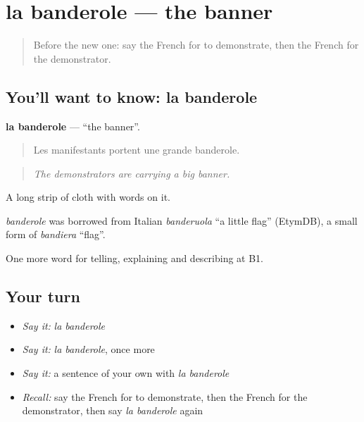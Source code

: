 \section[la banderole]{la banderole — the banner}

\label{lesson:FR-C363-banderole}



\begin{quote}
Before the new one: say the French for to demonstrate, then the French for the demonstrator.
\end{quote}

\subsection*{You'll want to know: la banderole}
\textbf{la banderole} — \textquotedblleft{}the banner\textquotedblright{}.

\begin{quote}
Les manifestants portent une grande banderole.
\end{quote}

\begin{quote}
\emph{The demonstrators are carrying a big banner.}
\end{quote}

A long strip of cloth with words on it.

\begin{cousinweb}
\emph{banderole} was borrowed from Italian \emph{banderuola} \textquotedblleft{}a little flag\textquotedblright{} (EtymDB), a small form of \emph{bandiera} \textquotedblleft{}flag\textquotedblright{}.
\end{cousinweb}

\begin{grammarlens}[title={What you've built}]
One more word for telling, explaining and describing at B1.
\end{grammarlens}

\subsection*{Your turn}
\begin{itemize}
\raggedright
  \item \emph{Say it:} \emph{la banderole}
  \item \emph{Say it:} \emph{la banderole}, once more
  \item \emph{Say it:} a sentence of your own with \emph{la banderole}
  \item \emph{Recall:} say the French for to demonstrate, then the French for the demonstrator, then say \emph{la banderole} again
\end{itemize}


